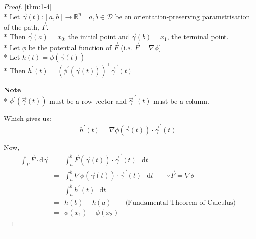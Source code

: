 \documentclass[10pt,a4paper]{report}
\theoremstyle{definition}
\theoremstyle{plain}
\theoremstyle{definition}
\theoremstyle{plain}
\newcommand{\dd}{\mathop{}\,\mathrm{d}}
\newcommand{\ddns}{\mathrm{d}}
\newenvironment{asidebox}{\par\begin{tcolorbox}\textbf{Note}\\*}{\end{tcolorbox}}
\newenvironment{proofenv}{\begin{proof}}{\end{proof}{\par\centering\rule{3cm}{.1pt}\par}}
\newcommand{\real}{\mathbb{R}}
\newcommand{\domain}{\mathcal{D}}
\newcommand{\vecprime}[1]{\vec{#1}^{\,\prime}}
\begin{document}
\begin{proofenv} \autoref{thm:1-4}\\*
    Let $\vec{\gamma}(t) \colon [a,b] \to \real^n \quad a,b \in \domain$ be an orientation-preserving parametrisation of the path, $\vec{\Gamma}$.\\*
    Then $\vec{\gamma}(a) = x_0$, the initial point and $\vec{\gamma}(b) = x_1$, the terminal point.\\*
    Let $\phi$ be the potential function of $\vec{F}$ (i.e. $\vec{F}=\nabla\phi$)\\*
    Let $h(t) = \phi(\vec{\gamma}(t))$\\*
    Then $h^\prime(t) = \left( \phi^\prime(\vec{\gamma}(t)) \right)^\top\vecprime{\gamma}(t)$
    \begin{asidebox}
	$\phi^\prime(\vec{\gamma}(t))$ must be a row vector and $\vecprime{\gamma}(t)$ must be a column.
    \end{asidebox}
    Which gives us:
    \[
	h^\prime(t) = \nabla\phi(\vec{\gamma}(t))\cdot\vecprime{\gamma}(t)
    \]
    
    Now,
    \begin{eqnarray*}
	\int_\Gamma \vec{F} \cdot\ddns\vec{\gamma} &=& \int_a^b \vec{F}(\vec{\gamma}(t)) \cdot \vecprime{\gamma}(t) \dd t\\
	&=& \int_a^b \nabla\phi(\vec{\gamma}(t))\cdot\vecprime{\gamma}(t) \dd t \qquad \because \vec{F} = \nabla\phi\\
	&=& \int_a^b h^\prime(t) \dd t \\
	&=& h(b) - h(a) \qquad \text{(Fundamental Theorem of Calculus)} \\
	&=& \phi(x_1) - \phi(x_2)
    \end{eqnarray*}
\end{proofenv}
\end{document}
